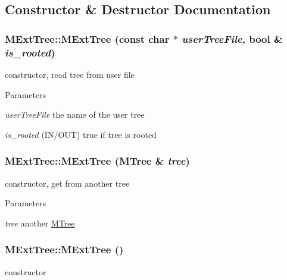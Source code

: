 \subsection{Constructor \& Destructor Documentation}
\hypertarget{classMExtTree_a98519878a9ba52ed6a8b6672666407af}{
\subsubsection[{MExtTree}]{\setlength{\rightskip}{0pt plus 5cm}MExtTree::MExtTree (const char $\ast$ {\em userTreeFile}, \/  bool \& {\em is\_\-rooted})}}
\label{classMExtTree_a98519878a9ba52ed6a8b6672666407af}
constructor, read tree from user file 
\begin{DoxyParams}{Parameters}
\item[{\em userTreeFile}]the name of the user tree \item[{\em is\_\-rooted}](IN/OUT) true if tree is rooted \end{DoxyParams}
\hypertarget{classMExtTree_a7a4160a0b7fccfa64ad1e26ceba7774b}{
\subsubsection[{MExtTree}]{\setlength{\rightskip}{0pt plus 5cm}MExtTree::MExtTree ({\bf MTree} \& {\em tree})}}
\label{classMExtTree_a7a4160a0b7fccfa64ad1e26ceba7774b}
constructor, get from another tree 
\begin{DoxyParams}{Parameters}
\item[{\em tree}]another \hyperlink{classMTree}{MTree} \end{DoxyParams}
\hypertarget{classMExtTree_abbad38db501392d69db9544b7f796054}{
\subsubsection[{MExtTree}]{\setlength{\rightskip}{0pt plus 5cm}MExtTree::MExtTree ()}}
\label{classMExtTree_abbad38db501392d69db9544b7f796054}
constructor 

